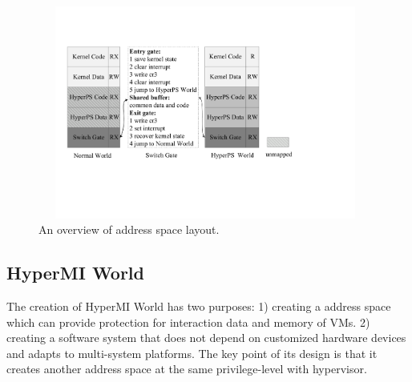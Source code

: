 \documentclass[conference]{IEEEtran}
\begin{document}
\fi





\begin{figure}
\centerline{\includegraphics[width=11cm, height=7cm]{pdfvmcs2.pdf}}%
\caption{An overview of address space layout.} \label{fig2}
\end{figure}



\subsection{HyperMI World} \label {HWorld}

The creation of HyperMI World has two purposes: 1) creating a address space which can provide protection for interaction data and memory of VMs. 2) creating a software system that does not depend on customized hardware devices and adapts to multi-system platforms. The key point of its design is that it creates another address space at the same privilege-level with hypervisor. %
\end{document}
